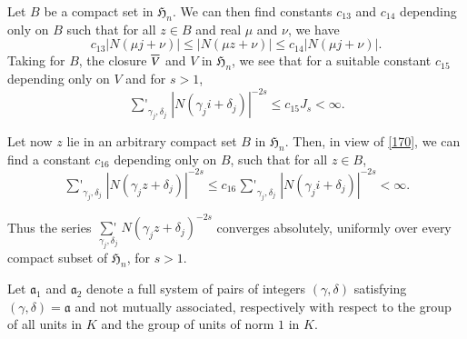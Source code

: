 Let $B$ be a compact set in $\mathfrak{H}_{n}$. We can then find
constants $c_{13}$ and $c_{14}$ depending only on $B$ such that for
all  $z\in B$ and real $\mu$ and $\nu$, we have
\begin{equation*}
c_{13}|N(\mu j+\nu)|\leq |N(\mu z+\nu)|\leq c_{14}|N(\mu
j+\nu)|.\tag{170}\label{170} 
\end{equation*}
Taking for $B$, the closure $\overline{V}$ and $V$ in $\mathfrak{H}_{n}$, we
see that for a suitable constant $c_{15}$ depending only on $V$ and
for $s>1$,
$$
\mathop{{\sum}'}_{\gamma_{j},\delta_{j}}|N(\gamma_{j}i+\delta_{j})|^{-2s}\leq
c_{15}J_{s}<\infty.
$$

Let now $z$ lie in an arbitrary compact set $B$ in
$\mathfrak{H}_{n}$. Then, in view of \eqref{170}, we can find a
constant $c_{16}$ depending only on $B$, such that for all $z\in B$,
$$
\mathop{{\sum}'}_{\gamma_{j},\delta_{j}}|N(\gamma_{j}z+\delta_{j})|^{-2s}\leq
c_{16}\mathop{{\sum}'}_{\gamma_{j},\delta_{j}}|N(\gamma_{j}i+\delta_{j})|^{-2s}<\infty.
$$

Thus the series
$\mathop{{\sum}'}\limits_{\gamma_{j},\delta_{j}}N(\gamma_{j}z+\delta_{j})^{-2s}$
converges absolutely, uniformly over every compact subset of
$\mathfrak{H}_{n}$, for $s>1$.

Let $\mathfrak{a}_{1}$ and $\mathfrak{a}_{2}$ denote a full system of
pairs of integers $(\gamma,\delta)$ satisfying
$(\gamma,\delta)=\mathfrak{a}$ and not mutually associated,
respectively with respect to the group of all units in $K$ and the
group of units of norm $1$ in $K$.

